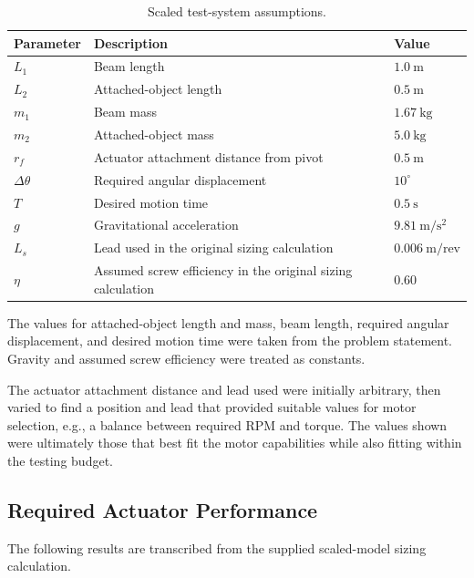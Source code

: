 \documentclass[11pt]{article}
\begin{document}
\begin{table}[h!]
\centering
\begin{tabularx}{\textwidth}{@{}l Y l@{}}
\toprule
\textbf{Parameter} & \textbf{Description} & \textbf{Value} \\
\midrule
$L_1$ & Beam length & $1.0\ \mathrm{m}$ \\
$L_2$ & Attached-object length & $0.5\ \mathrm{m}$ \\
$m_1$ & Beam mass & $1.67\ \mathrm{kg}$ \\
$m_2$ & Attached-object mass & $5.0\ \mathrm{kg}$ \\
$r_f$ & Actuator attachment distance from pivot & $0.5\ \mathrm{m}$ \\
$\Delta\theta$ & Required angular displacement & $10^\circ$ \\
$T$ & Desired motion time & $0.5\ \mathrm{s}$ \\
$g$ & Gravitational acceleration & $9.81\ \mathrm{m/s^2}$ \\
$L_s$ & Lead used in the original sizing calculation & $0.006\ \mathrm{m/rev}$ \\
$\eta$ & Assumed screw efficiency in the original sizing calculation & $0.60$ \\
\bottomrule
\end{tabularx}
\caption{Scaled test-system assumptions.}
\end{table}

The values for attached-object length and mass, beam length, required angular
displacement, and desired motion time were taken from the problem statement.
Gravity and assumed screw efficiency were treated as constants.

The actuator attachment distance and lead used were initially arbitrary,
then varied to find a position and lead that provided suitable values for
motor selection, e.g., a balance between required RPM and torque. The values
shown were ultimately those that best fit the motor capabilities while also
fitting within the testing budget.

\newpage

\subsection{Required Actuator Performance}

The following results are transcribed from the supplied scaled-model sizing
calculation.
\end{document}
